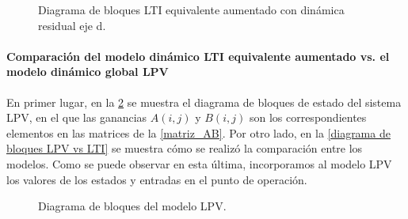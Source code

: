 \documentclass[a4paper, 10pt, onecolumn,journal]{ieeeconf}
\begin{document}
\begin{figure}[H]
	\centering
	\begin{adjustbox}{max width=\columnwidth}
	\end{adjustbox}
	\caption{Diagrama de bloques LTI equivalente aumentado con dinámica residual eje d.}
	\label{diagrama de bloques modelo LTI eq}
\end{figure}

\paragraph{\textbf{Comparación del modelo dinámico LTI equivalente aumentado vs. el modelo dinámico global LPV}}
En primer lugar, en la \cref{diagrama de bloques LPV} se muestra el diagrama de bloques de estado del sistema LPV, en el que las ganancias $A(i, j)$ y $B(i, j)$
son los correspondientes elementos en las matrices de la \cref{matriz_AB}.
Por otro lado, en la \cref{diagrama de bloques LPV vs LTI} se muestra cómo se realizó la comparación entre los modelos. Como se puede observar en esta última,
incorporamos al modelo LPV los valores de los estados y entradas en el punto de operación.
\label{par: LTI vs LPV}
\begin{figure}[H]
	\centering
	\begin{adjustbox}{max width=\columnwidth}
	\end{adjustbox}
	\caption{Diagrama de bloques del modelo LPV.}
	\label{diagrama de bloques LPV}
\end{figure}
\end{document}
